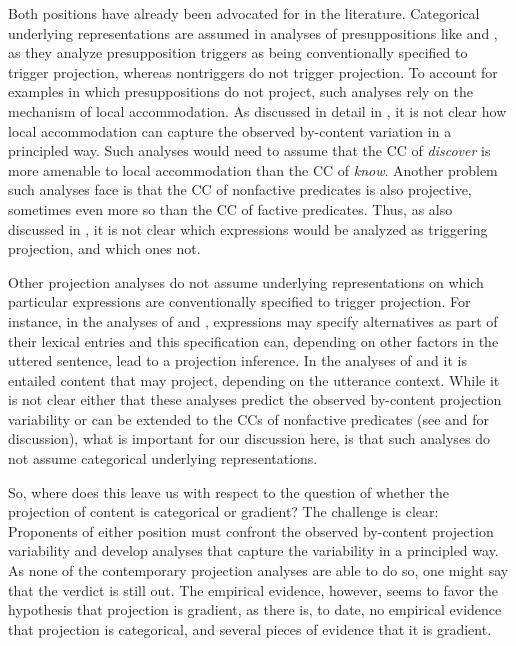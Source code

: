 \documentclass[11pt,fleqn]{article}
\newcommand{\6}{\mbox{$[\hspace*{-.6mm}[$}}
\newcommand{\9}{\mbox{$]\hspace*{-.6mm}]$}}
\begin{document}
Both positions have already been advocated for in the literature. Categorical underlying representations are assumed in analyses of presuppositions like \citealt{heim83} and \citealt{vds92}, as they analyze presupposition triggers as being conventionally specified to trigger projection, whereas nontriggers do not trigger projection. To account for examples in which presuppositions do not project, such analyses rely on the mechanism of local accommodation. As discussed in detail in \citealt{tbd-variability}, it is not clear how local accommodation can capture the observed by-content variation in a principled way. Such analyses would need to assume that the CC of {\em discover} is more amenable to local accommodation than the CC of {\em know}. Another problem such analyses face is that the CC of nonfactive predicates is also projective, sometimes even more so than the CC of factive predicates. Thus, as also discussed in \citealt{degen-tonhauser-language}, it is not clear which expressions would be analyzed as triggering projection, and which ones not.

Other projection analyses do not assume underlying representations on which particular expressions are conventionally specified to trigger projection. For instance, in the analyses of \citealt{abusch02,abusch10} and \citealt{romoli2015}, expressions may specify alternatives as part of their lexical entries and this specification can, depending on other factors in the uttered sentence, lead to a projection inference. In the analyses of  \citealt{abrusan2011,abrusan2016} and \citealt{brst-salt10,simons-etal2017} it is entailed content that may project, depending on the utterance context. While it is not clear either that these analyses predict the observed by-content projection variability or can be extended to the CCs of nonfactive predicates (see \citealt{tbd-variability} and \citealt{degen-tonhauser-language} for discussion), what is important for our discussion here, is that such analyses do not assume categorical underlying representations.

So, where does this leave us with respect to the question of whether the projection of content is categorical or gradient? The challenge is clear: Proponents of either position must confront the observed by-content projection variability and develop analyses that capture the variability in a principled way. As none of the contemporary projection analyses are able to do so, one might say that the verdict is still out. The empirical evidence, however, seems to favor the hypothesis that projection is gradient, as there is, to date, no empirical evidence that projection is categorical, and several pieces of evidence that it is gradient.
\end{document}
